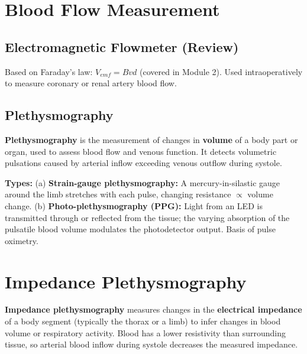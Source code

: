 \documentclass[12pt,a4paper]{article}
\begin{document}
\section{Blood Flow Measurement}

\subsection{Electromagnetic Flowmeter (Review)}

Based on Faraday's law: $V_{emf} = Bvd$ (covered in Module 2). Used intraoperatively to measure coronary or renal artery blood flow.

\subsection{Plethysmography}

\begin{tcolorbox}[defbox, title={\textbf{Plethysmography}}]
\textbf{Plethysmography} is the measurement of changes in \textbf{volume} of a body part or organ, used to assess blood flow and venous function. It detects volumetric pulsations caused by arterial inflow exceeding venous outflow during systole.
\end{tcolorbox}

\textbf{Types:} (a) \textbf{Strain-gauge plethysmography:} A mercury-in-silastic gauge around the limb stretches with each pulse, changing resistance $\propto$ volume change. (b) \textbf{Photo-plethysmography (PPG):} Light from an LED is transmitted through or reflected from the tissue; the varying absorption of the pulsatile blood volume modulates the photodetector output. Basis of pulse oximetry.

\section{Impedance Plethysmography}

\begin{tcolorbox}[defbox, title={\textbf{Impedance Plethysmography}}]
\textbf{Impedance plethysmography} measures changes in the \textbf{electrical impedance} of a body segment (typically the thorax or a limb) to infer changes in blood volume or respiratory activity. Blood has a lower resistivity than surrounding tissue, so arterial blood inflow during systole decreases the measured impedance.
\end{tcolorbox}
\end{document}
